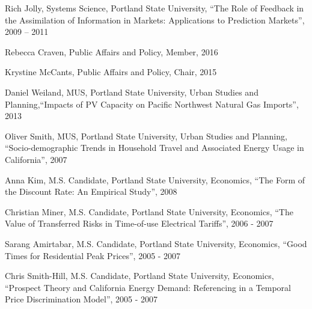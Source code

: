 \documentclass[Computer Science]{vita}
\begin{document}
\begin{vita}
\begin{Instructional Activities}
\begin{Ph.D. Thesis Committee}
    \item Rich Jolly, Systems Science, Portland State University,
      ``The Role of Feedback in the Assimilation of Information in
      Markets: Applications to Prediction Markets'', 2009 -- 2011


    \end{Ph.D. Thesis Committee}



  \begin{Ph.D. Field Committee}

  \item Rebecca Craven, Public Affairs and Policy, Member, 2016
  \item Krystine McCants, Public Affairs and Policy, Chair, 2015
  
  \end{Ph.D. Field Committee}


    \begin{M.S. Thesis Adviser}
    \item Daniel Weiland, MUS, Portland State University,
      Urban Studies and Planning,``Impacts of PV Capacity on Pacific Northwest Natural Gas Imports'', 2013
    
    \item Oliver Smith, MUS, Portland State University,
      Urban Studies and Planning, ``Socio-demographic Trends in
      Household Travel and Associated Energy Usage in California'',
      2007

    \end{M.S. Thesis Adviser}

    \begin{M.S. Project Adviser}
    \item Anna Kim, M.S. Candidate, Portland State University,
      Economics, ``The Form of the Discount Rate: An Empirical
      Study'', 2008

    \item Christian Miner, M.S. Candidate, Portland State University,
      Economics, ``The Value of Transferred Risks in Time-of-use
      Electrical Tariffs'', 2006 - 2007

    \item Sarang Amirtabar, M.S. Candidate, Portland State University,
      Economics, ``Good Times for Residential Peak Prices'', 2005 -
      2007

    \item Chris Smith-Hill, M.S. Candidate, Portland State University,
      Economics, ``Prospect Theory and California Energy Demand:
      Referencing in a Temporal Price Discrimination Model'', 2005 -
      2007
    \end{M.S. Project Adviser}


\end{Instructional Activities}
\end{vita}
\end{document}
